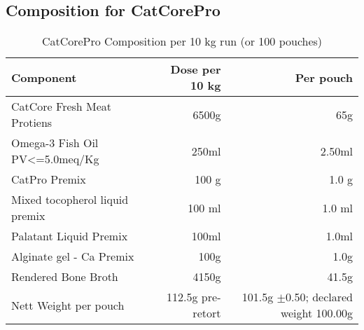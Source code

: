 \subsection*{Composition for CatCorePro}

\begin{table}[h]
\centering
\caption{CatCorePro Composition per 10 kg run (or 100 pouches)}
\label{tab catcorepro_composition}
\begin{tabular}{@{}l r r@{}}
\toprule
\textbf{Component} & \textbf{Dose per 10 kg} & \textbf{Per pouch} \\
\midrule
CatCore Fresh Meat Protiens & 6500g & 65g \\ [3pt]
Omega-3 Fish Oil PV<=5.0meq/Kg & 250ml & 2.50ml \\[3pt]
CatPro Premix & 100 g & 1.0 g \\[3pt]
Mixed tocopherol liquid premix & 100 ml & 1.0 ml \\[3pt]
Palatant Liquid Premix & 100ml & 1.0ml \\[3pt]
Alginate gel - Ca Premix & 100g & 1.0g \\[3pt]
\midrule
Rendered Bone Broth & 4150g & 41.5g  \\[3pt]
\midrule
Nett Weight per pouch & 112.5g pre-retort & 101.5g $\pm$0.50; declared weight 100.00g\\[3pt]
\bottomrule
\end{tabular}
\end{table}

